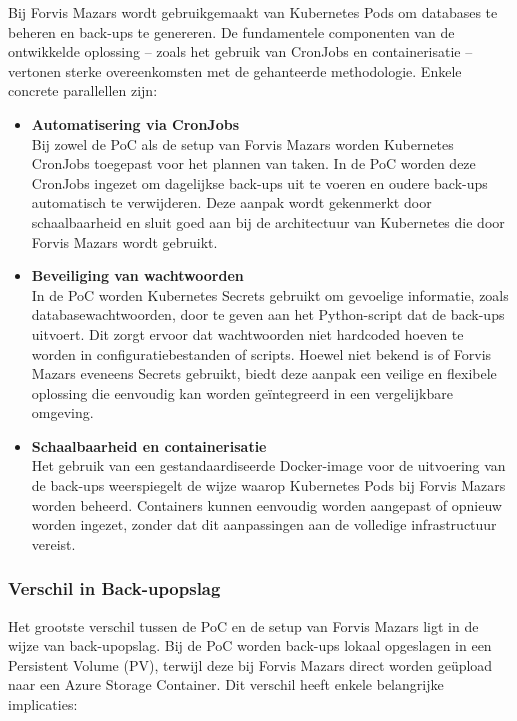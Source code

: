 Bij Forvis Mazars wordt gebruikgemaakt van Kubernetes Pods om databases te beheren en back-ups te genereren. De fundamentele componenten van de ontwikkelde oplossing – zoals het gebruik van CronJobs en containerisatie – vertonen sterke overeenkomsten met de gehanteerde methodologie. Enkele concrete parallellen zijn:

\begin{itemize}
    \item \textbf{Automatisering via CronJobs} \\
    Bij zowel de PoC als de setup van Forvis Mazars worden Kubernetes CronJobs toegepast voor het plannen van taken. In de PoC worden deze CronJobs ingezet om dagelijkse back-ups uit te voeren en oudere back-ups automatisch te verwijderen. Deze aanpak wordt gekenmerkt door schaalbaarheid en sluit goed aan bij de architectuur van Kubernetes die door Forvis Mazars wordt gebruikt.
    
    \item \textbf{Beveiliging van wachtwoorden} \\
    In de PoC worden Kubernetes Secrets gebruikt om gevoelige informatie, zoals databasewachtwoorden, door te geven aan het Python-script dat de back-ups uitvoert. Dit zorgt ervoor dat wachtwoorden niet hardcoded hoeven te worden in configuratiebestanden of scripts. Hoewel niet bekend is of Forvis Mazars eveneens Secrets gebruikt, biedt deze aanpak een veilige en flexibele oplossing die eenvoudig kan worden geïntegreerd in een vergelijkbare omgeving.
    
    \item \textbf{Schaalbaarheid en containerisatie} \\
    Het gebruik van een gestandaardiseerde Docker-image voor de uitvoering van de back-ups weerspiegelt de wijze waarop Kubernetes Pods bij Forvis Mazars worden beheerd. Containers kunnen eenvoudig worden aangepast of opnieuw worden ingezet, zonder dat dit aanpassingen aan de volledige infrastructuur vereist.
\end{itemize}


\subsubsection*{Verschil in Back-upopslag}

Het grootste verschil tussen de PoC en de setup van Forvis Mazars ligt in de wijze van back-upopslag. Bij de PoC worden back-ups lokaal opgeslagen in een Persistent Volume (PV), terwijl deze bij Forvis Mazars direct worden geüpload naar een Azure Storage Container. Dit verschil heeft enkele belangrijke implicaties:

